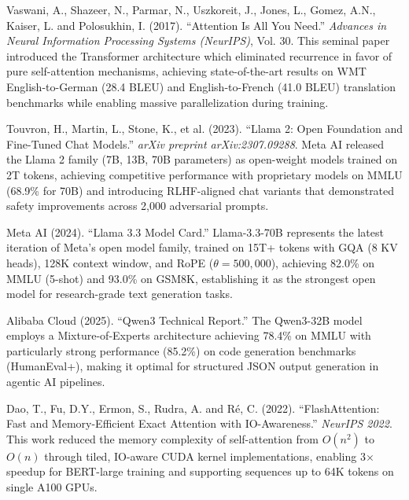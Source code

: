 \documentclass[a4paper,12pt,openany]{report}
\begin{document}
\begin{enumerate}[label={[\arabic*]}, leftmargin=2cm]

\item Vaswani, A., Shazeer, N., Parmar, N., Uszkoreit, J., Jones, L., Gomez, A.N., Kaiser, L. and Polosukhin, I. (2017). ``Attention Is All You Need.'' \textit{Advances in Neural Information Processing Systems (NeurIPS)}, Vol. 30. This seminal paper introduced the Transformer architecture which eliminated recurrence in favor of pure self-attention mechanisms, achieving state-of-the-art results on WMT English-to-German (28.4 BLEU) and English-to-French (41.0 BLEU) translation benchmarks while enabling massive parallelization during training.

\item Touvron, H., Martin, L., Stone, K., et al. (2023). ``Llama 2: Open Foundation and Fine-Tuned Chat Models.'' \textit{arXiv preprint arXiv:2307.09288}. Meta AI released the Llama 2 family (7B, 13B, 70B parameters) as open-weight models trained on 2T tokens, achieving competitive performance with proprietary models on MMLU (68.9\% for 70B) and introducing RLHF-aligned chat variants that demonstrated safety improvements across 2,000 adversarial prompts.

\item Meta AI (2024). ``Llama 3.3 Model Card.'' Llama-3.3-70B represents the latest iteration of Meta's open model family, trained on 15T+ tokens with GQA (8 KV heads), 128K context window, and RoPE ($\theta = 500{,}000$), achieving 82.0\% on MMLU (5-shot) and 93.0\% on GSM8K, establishing it as the strongest open model for research-grade text generation tasks.

\item Alibaba Cloud (2025). ``Qwen3 Technical Report.'' The Qwen3-32B model employs a Mixture-of-Experts architecture achieving 78.4\% on MMLU with particularly strong performance (85.2\%) on code generation benchmarks (HumanEval+), making it optimal for structured JSON output generation in agentic AI pipelines.

\item Dao, T., Fu, D.Y., Ermon, S., Rudra, A. and R\'{e}, C. (2022). ``FlashAttention: Fast and Memory-Efficient Exact Attention with IO-Awareness.'' \textit{NeurIPS 2022}. This work reduced the memory complexity of self-attention from $O(n^2)$ to $O(n)$ through tiled, IO-aware CUDA kernel implementations, enabling 3$\times$ speedup for BERT-large training and supporting sequences up to 64K tokens on single A100 GPUs.


\end{enumerate}
\end{document}
